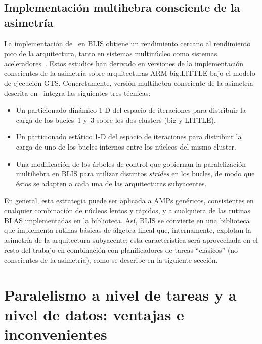 

\subsection{Implementación multihebra consciente de la asimetría}

La implementación de \gemm\ en BLIS obtiene un rendimiento cercano al rendimiento pico de la arquitectura,
tanto en sistemas multinúcleo como sistemas aceleradores~\cite{BLIS2,BLIS3}. 
Estos estudios han derivado en versiones de la implementación conscientes de la asimetría sobre arquitecturas ARM big.LITTLE
bajo el modelo de ejecución GTS. Concretamente, versión multihebra consciente de la asimetría descrita en~\cite{asymBLIS} 
integra las siguientes tres técnicas:
\begin{itemize}
\item Un particionado dinámico 1-D del espacio de iteraciones para distribuir la carga de los bucles~1 y~3 sobre los dos
	clusters (big y LITTLE).
\item Un particionado estático 1-D del espacio de iteraciones para distribuir la carga de uno de los  bucles internos entre los núcleos
	del mismo cluster.
\item Una modificación de los árboles de control que gobiernan la paralelización multihebra en BLIS para utilizar distintos {\em strides} en 
	los bucles, de modo que éstos se adapten a cada una de las arquitecturas subyacentes.
\end{itemize}

En general, esta estrategia puede ser aplicada a AMPs genéricos, consistentes en cualquier combinación de núcleos lentos y rápidos, y a cualquiera
de las rutinas BLAS implementadas en la biblioteca. Así, BLIS se convierte en una biblioteca que implementa rutinas básicas de álgebra lineal que,
internamente, explotan la asimetría de la arquitectura subyacente; esta característica será aprovechada en el resto del trabajo en combinación
con planificadores de tareas ``clásicos'' (no conscientes de la asimetría), como se describe en la siguiente sección.


\section{Paralelismo a nivel de tareas y a nivel de datos: ventajas e inconvenientes}
\label{sec:comparativa}


